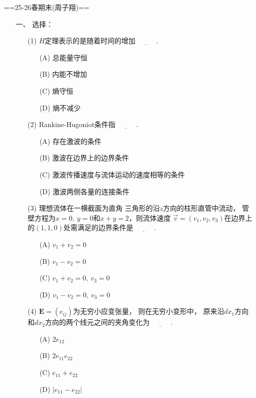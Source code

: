 
==25-26春期末(周子翔)==
\begin{itemize}
    \item[一、]选择：
    \begin{itemize}
        \item[(1)] $H$定理表示的是随着时间的增加$\underline{\qquad\quad}$.
        \begin{itemize}
            \item[(A)] 总能量守恒
            \item[(B)] 内能不增加
            \item[(C)] 熵守恒
            \item[(D)] 熵不减少
        \end{itemize}

        \item[(2)] Rankine-Hugoniot条件指$\underline{\qquad\quad}$.
        \begin{itemize}
            \item[(A)] 存在激波的条件
            \item[(B)] 激波在边界上的边界条件
            \item[(C)] 激波传播速度与流体运动的速度相等的条件
            \item[(D)] 激波两侧各量的连接条件
        \end{itemize}

        \item[(3)] 理想流体在一横截面为直角
        三角形的沿$z$方向的柱形直管中流动，
        管壁方程为$x=0,\ y=0$和$x+y=2$，则流体速度
        $\vec v=(v_1,v_2,v_3)$在边界上的$(1,1,0)$处需满足的边界条件是$\underline{\qquad\quad}$.
        \begin{itemize}
            \item[(A)] $v_1+v_2=0$
            \item[(B)] $v_1-v_2=0$
            \item[(C)] $v_1+v_2=0,\ v_3=0$
            \item[(D)] $v_1-v_2=0,\ v_3=0$
        \end{itemize}

        \item[(4)] $\bm{E}=(e_{ij})$为无穷小应变张量，
        则在无穷小变形中，
        原来沿$dx_1$方向和$dx_2$方向的两个线元之间的夹角变化为$\underline{\qquad\quad}$.
        \begin{itemize}
            \item[(A)] $2e_{12}$
            \item[(B)] $2e_{11}e_{22}$
            \item[(C)] $e_{11}+e_{22}$
            \item[(D)] $|e_{11}-e_{22}|$
        \end{itemize}


\end{itemize}
\end{itemize}
